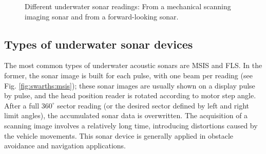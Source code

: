 \documentclass[final,5p,times]{elsarticle}
\begin{document}
\begin{figure}[t]
    \centering
    \captionsetup{justification=centering}
    \caption{Different underwater sonar readings:  From a mechanical scanning imaging sonar and  from a forward-looking sonar.}
    \label{fig:sonar_devices}
\end{figure}

\subsection{Types of underwater sonar devices}
\label{sonar:devices}

The most common types of underwater acoustic sonars are MSIS and FLS. In the former, the sonar image is built for each pulse, with one beam per reading (see Fig. \ref{fig:swarths:msis}); these sonar images are usually shown on a display pulse by pulse, and the head position reader is rotated according to motor step angle. After a full $360^{\circ}$ sector reading (or the desired sector defined by left and right limit angles), the accumulated sonar data is overwritten. The acquisition of a scanning image involves a relatively long time, introducing distortions caused by the vehicle movements. This sonar device is generally applied in obstacle avoidance \cite{ganesan2015} and navigation \cite{ribas2010} applications.
\end{document}
